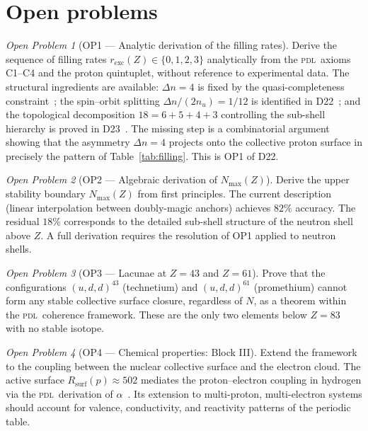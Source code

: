 \documentclass{article}
\theoremstyle{remark}
\newtheorem{openproblem}{Open Problem}
\newcommand{\PDL}{\textsc{pdl}}
\newcommand{\Rsurf}{R_{\mathrm{surf}}}
\newcommand{\Nmax}{N_{\max}}
\newcommand{\Deltanop}{\Delta n}
\begin{document}
\section{Open problems}
\label{sec:open}

\begin{openproblem}[OP1 --- Analytic derivation of the filling rates]
\label{op:filling}
Derive the sequence of filling rates $r_{\mathrm{exc}}(Z) \in \{0,1,2,3\}$ analytically from the \PDL\ axioms C1--C4 and the proton quintuplet, without reference to experimental data. The structural ingredients are available: $\Deltanop = 4$ is fixed by the quasi-completeness constraint~\cite{D25}; the spin--orbit splitting $\Deltanop/(2n_u) = 1/12$ is identified in D22~\cite{D22}; and the topological decomposition $18 = 6+5+4+3$ controlling the sub-shell hierarchy is proved in D23~\cite{D23}. The missing step is a combinatorial argument showing that the asymmetry $\Deltanop = 4$ projects onto the collective proton surface in precisely the pattern of Table~\ref{tab:filling}. This is OP1 of D22.
\end{openproblem}

\begin{openproblem}[OP2 --- Algebraic derivation of $\Nmax(Z)$]
\label{op:nmax}
Derive the upper stability boundary $\Nmax(Z)$ from first principles. The current description (linear interpolation between doubly-magic anchors) achieves $82\%$ accuracy. The residual $18\%$ corresponds to the detailed sub-shell structure of the neutron shell above $Z$. A full derivation requires the resolution of OP1 applied to neutron shells.
\end{openproblem}

\begin{openproblem}[OP3 --- Lacunae at $Z = 43$ and $Z = 61$]
\label{op:lacunae}
Prove that the configurations $(u,d,d)^{43}$ (technetium) and $(u,d,d)^{61}$ (promethium) cannot form any stable collective surface closure, regardless of $N$, as a theorem within the \PDL\ coherence framework. These are the only two elements below $Z = 83$ with no stable isotope.
\end{openproblem}

\begin{openproblem}[OP4 --- Chemical properties: Block III]
\label{op:chemistry}
Extend the framework to the coupling between the nuclear collective surface and the electron cloud. The active surface $\Rsurf(p) \approx 502$ mediates the proton--electron coupling in hydrogen via the \PDL\ derivation of $\alpha$~\cite{D12}. Its extension to multi-proton, multi-electron systems should account for valence, conductivity, and reactivity patterns of the periodic table.
\end{openproblem}
\end{document}

